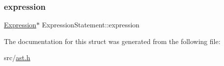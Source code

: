 \subsubsection{\texorpdfstring{expression}{expression}}
{\footnotesize\ttfamily \hyperlink{struct_expression}{Expression}$\ast$ Expression\+Statement\+::expression}



The documentation for this struct was generated from the following file\+:\begin{DoxyCompactItemize}
\item 
src/\hyperlink{ast_8h}{ast.\+h}\end{DoxyCompactItemize}
